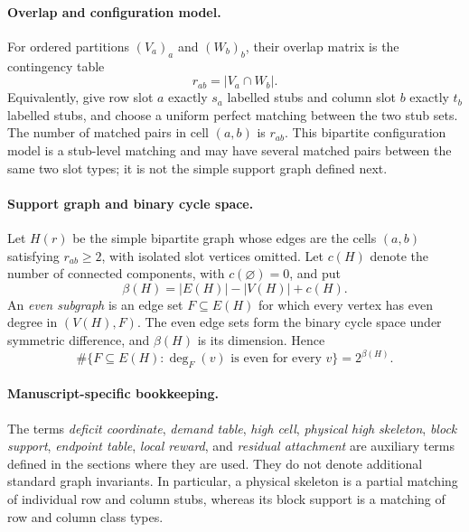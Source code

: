 \paragraph{Overlap and configuration model.}
For ordered partitions \((V_a)_a\) and \((W_b)_b\), their overlap matrix is the
contingency table
\[
  r_{ab}=|V_a\cap W_b|.
\]
Equivalently, give row slot \(a\) exactly \(s_a\) labelled stubs and column slot
\(b\) exactly \(t_b\) labelled stubs, and choose a uniform perfect matching
between the two stub sets. The number of matched pairs in cell \((a,b)\) is
\(r_{ab}\). This bipartite configuration model is a stub-level matching and
may have several matched pairs between the same two slot types; it is not the
simple support graph defined next.

\paragraph{Support graph and binary cycle space.}
Let \(H(r)\) be the simple bipartite graph whose edges are the cells
\((a,b)\) satisfying \(r_{ab}\ge2\), with isolated slot vertices omitted. Let
\(c(H)\) denote the number of connected components, with \(c(\varnothing)=0\),
and put
\[
  \beta(H)=|E(H)|-|V(H)|+c(H).
\]
An \emph{even subgraph} is an edge set \(F\subseteq E(H)\) for which every
vertex has even degree in \((V(H),F)\). The even edge sets form the binary cycle
space under symmetric difference, and \(\beta(H)\) is its dimension. Hence
\[
  \#\{F\subseteq E(H):\deg_F(v)\text{ is even for every }v\}
  =2^{\beta(H)}.
\]

\paragraph{Manuscript-specific bookkeeping.}
The terms \emph{deficit coordinate}, \emph{demand table}, \emph{high cell},
\emph{physical high skeleton}, \emph{block support}, \emph{endpoint table},
\emph{local reward}, and \emph{residual attachment} are auxiliary terms defined
in the sections where they are used. They do not denote additional standard
graph invariants. In particular, a physical skeleton is a partial matching of
individual row and column stubs, whereas its block support is a matching of row
and column class types.
